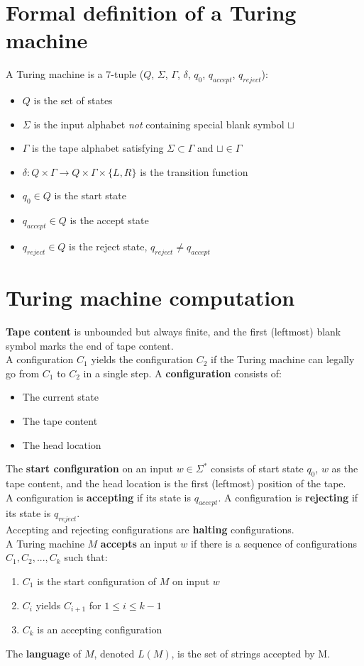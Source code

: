 \documentclass{article}
\begin{document}
\section{Formal definition of a Turing machine}
A Turing machine is a 7-tuple ($Q$, $\Sigma$, $\Gamma$, $\delta$, $q_0$, $q_{accept}$, $q_{reject}$):
\begin{itemize}
	\item $Q$ is the set of states
	\item $\Sigma$ is the input alphabet \textit{not} containing special blank symbol $\sqcup$
	\item $\Gamma$ is the tape alphabet satisfying $\Sigma \subset \Gamma$ and $\sqcup \in \Gamma$
	\item $\delta : Q \times \Gamma \rightarrow Q \times \Gamma \times \{L, R\}$ is the transition function
	\item $q_0 \in Q$ is the start state
	\item $q_{accept} \in Q$ is the accept state
	\item $q_{reject} \in Q$ is the reject state, $q_{reject} \neq q_{accept}$
\end{itemize}

\section{Turing machine computation}
\textbf{Tape content} is unbounded but always finite, and the first (leftmost) blank symbol marks the end of tape content.\medskip
\\A configuration $C_1$ yields the configuration $C_2$ if the Turing machine can legally go from $C_1$ to $C_2$ in a single step. A \textbf{configuration} consists of:
\begin{itemize}
	\item The current state
	\item The tape content
	\item The head location
\end{itemize}
The \textbf{start configuration} on an input $w \in \Sigma^*$ consists of start state $q_0$, $w$ as the tape content, and the head location is the first (leftmost) position of the tape.\medskip
\\A configuration is \textbf{accepting} if its state is $q_{accept}$. A configuration is \textbf{rejecting} if its state is $q_{reject}$.\medskip
\\Accepting and rejecting configurations are \textbf{halting} configurations.\medskip
%
\\ A Turing machine $M$ \textbf{accepts} an input $w$ if there is a sequence of configurations $C_1, C_2, ..., C_k$ such that:
\begin{enumerate}
	\item $C_1$ is the start configuration of $M$ on input $w$
	\item $C_i$ yields $C_{i+1}$ for $1 \leq i \leq k-1$
	\item $C_k$ is an accepting configuration
\end{enumerate}\medskip
The \textbf{language} of $M$, denoted $L(M)$, is the set of strings accepted by M.
\end{document}
